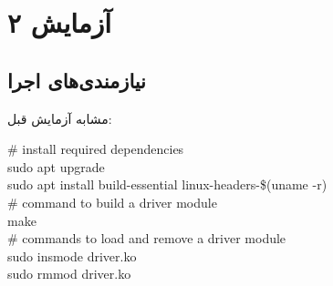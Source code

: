 \documentclass[12pt]{article}
\begin{document}
	\section{آزمایش ۲}
	\subsection{نیازمندی‌های اجرا}
	مشابه آزمایش قبل:
	
	\begin{english}
		\noindent
		\# install required dependencies \\
		sudo apt upgrade \\
		sudo apt install build-essential linux-headers-\$(uname -r) \\
		\# command to build a driver module \\
		make \\
		\# commands to load and remove a driver module \\
		sudo insmode driver.ko \\
		sudo rmmod driver.ko
	\end{english}
\end{document}
